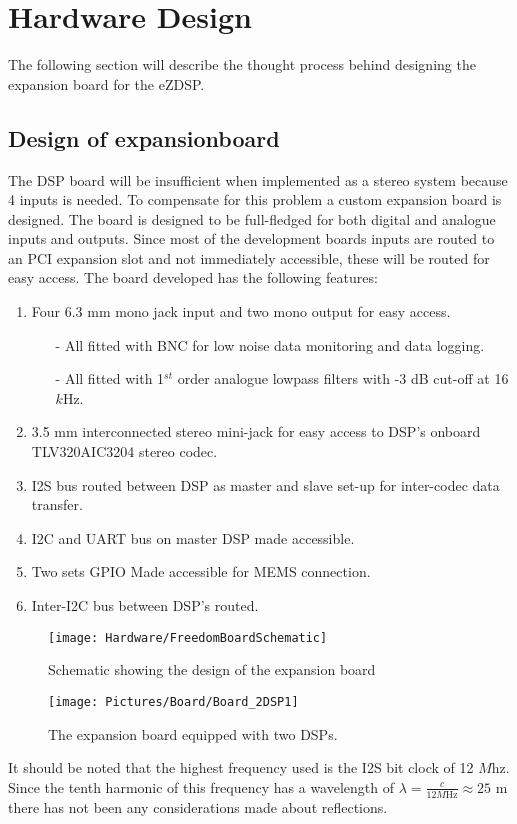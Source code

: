 \section{Hardware Design}
The following section will describe the thought process behind designing the expansion board for the eZDSP. 


\subsection{Design of expansionboard}\label{subsec:DesignOfExpansion}

The DSP board will be insufficient when implemented as a stereo system because 4 inputs is needed. To compensate for this problem a custom expansion board is designed. The board is designed to be full-fledged for both digital and analogue inputs and outputs. Since most of the development boards inputs are routed to an PCI expansion slot and not immediately accessible, these will be routed for easy access. The board developed has the following features:

\begin{enumerate}
	\item Four 6.3 mm mono jack input and two mono output for easy access.
	\begin{itemize}
		\item[-] All fitted with BNC for low noise data monitoring and data logging.
		\item[-] All fitted with 1$^{st}$ order analogue lowpass filters with -3 dB cut-off at 16 $k$Hz.
	\end{itemize}
	\item 3.5 mm interconnected stereo mini-jack for easy access to DSP's onboard TLV320AIC3204 stereo codec.
	\item I2S bus routed between DSP as master and slave set-up for inter-codec data transfer.
	\item I2C and UART bus on master DSP made accessible.
	\item Two sets GPIO Made accessible for MEMS connection.
	\item Inter-I2C bus between DSP's routed. 
\end{enumerate}


\begin{figure}[H]
	\centering
	\texttt{[image: Hardware/FreedomBoardSchematic]}	
	\caption{Schematic showing the design of the expansion board}
	\label{fig:PCBboardSchem}
\end{figure}


\begin{figure}[H]
	\centering
	\texttt{[image: Pictures/Board/Board\_2DSP1]}	
	\caption{The expansion board equipped with two DSPs.}
	\label{fig:PCBboard}
\end{figure}

It should be noted that the highest frequency used is the I2S bit clock of 12 $M$hz. Since the tenth harmonic of this frequency has a wavelength of $\lambda=\frac{c}{12M \text{Hz}}\approx25\text{ m}$ there has not been any considerations made about reflections.